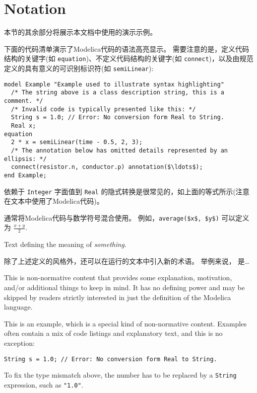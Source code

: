 \section{Notation}\label{notation}

本节的其余部分将展示本文档中使用的演示示例。

下面的代码清单演示了Modelica代码的语法高亮显示。
需要注意的是，定义代码结构的关键字(如 \lstinline!equation!)、不定义代码结构的关键字(如 \lstinline!connect!)，以及由规范定义的具有意义的可识别标识符(如 \lstinline!semiLinear!):
\begin{lstlisting}[language=modelica]
model Example "Example used to illustrate syntax highlighting"
  /* The string above is a class description string, this is a comment. */
  /* Invalid code is typically presented like this: */
  String s = 1.0; // Error: No conversion form Real to String.
  Real x;
equation
  2 * x = semiLinear(time - 0.5, 2, 3);
  /* The annotation below has omitted details represented by an ellipsis: */
  connect(resistor.n, conductor.p) annotation($\ldots$);
end Example;
\end{lstlisting}

依赖于 \lstinline!Integer! 字面值到 \lstinline!Real! 的隐式转换是很常见的，如上面的等式所示(注意在文本中使用了Modelica代码)。

通常将Modelica代码与数学符号混合使用。
例如，\lstinline!average($x$, $y$)! 可以定义为 $\frac{x + y}{2}$.

\begin{definition}[Something]%
Text defining the meaning of \emph{something}.
\end{definition}

除了上述定义的风格外，还可以在运行的文本中引入新的术语。
举例来说， 是\ldots

\begin{nonnormative}
This is non-normative content that provides some explanation, motivation, and/or additional things to keep in mind.
It has no defining power and may be skipped by readers strictly interested in just the definition of the Modelica language.
\end{nonnormative}

\begin{example}
This is an example, which is a special kind of non-normative content.
Examples often contain a mix of code listings and explanatory text, and this is no exception:
\begin{lstlisting}[language=modelica]
String s = 1.0; // Error: No conversion form Real to String.
\end{lstlisting}
To fix the type mismatch above, the number has to be replaced by a \lstinline!String! expression, such as \lstinline!"1.0"!.
\end{example}

